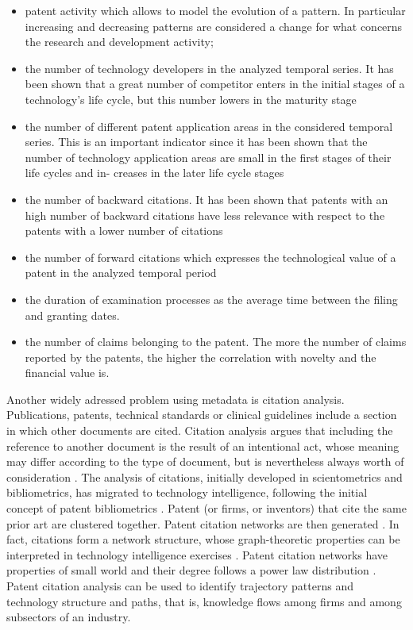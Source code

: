 \documentclass[b5paper,]{book}
\providecommand{\tightlist}{%
  \setlength{\itemsep}{0pt}\setlength{\parskip}{0pt}}
\theoremstyle{definition}
\theoremstyle{definition}
\theoremstyle{definition}
\theoremstyle{remark}
\begin{document}
\begin{itemize}
\tightlist
\item
  patent activity which allows to model the evolution of a pattern. In
  particular increasing and decreasing patterns are considered a change
  for what concerns the research and development activity;
\item
  the number of technology developers in the analyzed temporal series.
  It has been shown that a great number of competitor enters in the
  initial stages of a technology's life cycle, but this number lowers in
  the maturity stage
\item
  the number of different patent application areas in the considered
  temporal series. This is an important indicator since it has been
  shown that the number of technology application areas are small in the
  first stages of their life cycles and in- creases in the later life
  cycle stages
\item
  the number of backward citations. It has been shown that patents with
  an high number of backward citations have less relevance with respect
  to the patents with a lower number of citations
\item
  the number of forward citations which expresses the technological
  value of a patent in the analyzed temporal period
\item
  the duration of examination processes as the average time between the
  filing and granting dates.
\item
  the number of claims belonging to the patent. The more the number of
  claims reported by the patents, the higher the correlation with
  novelty and the financial value is.
\end{itemize}

Another widely adressed problem using metadata is citation analysis.
Publications, patents, technical standards or clinical guidelines
include a section in which other documents are cited. Citation analysis
argues that including the reference to another document is the result of
an intentional act, whose meaning may differ according to the type of
document, but is nevertheless always worth of consideration
\citep{moed2006citation}. The analysis of citations, initially developed
in scientometrics and bibliometrics, has migrated to technology
intelligence, following the initial concept of patent bibliometrics
\citep{narin1994patent}. Patent (or firms, or inventors) that cite the
same prior art are clustered together. Patent citation networks are then
generated \citep{karki1997patent, erdi2013prediction}. In fact,
citations form a network structure, whose graph-theoretic properties can
be interpreted in technology intelligence exercises
\citep{lee2017knowledge}. Patent citation networks have properties of
small world \citep{cowan2004network} and their degree follows a power
law distribution \citep{chen2004tracing}. Patent citation analysis can
be used to identify trajectory patterns and technology structure and
paths, that is, knowledge flows among firms and among subsectors of an
industry.
\end{document}
